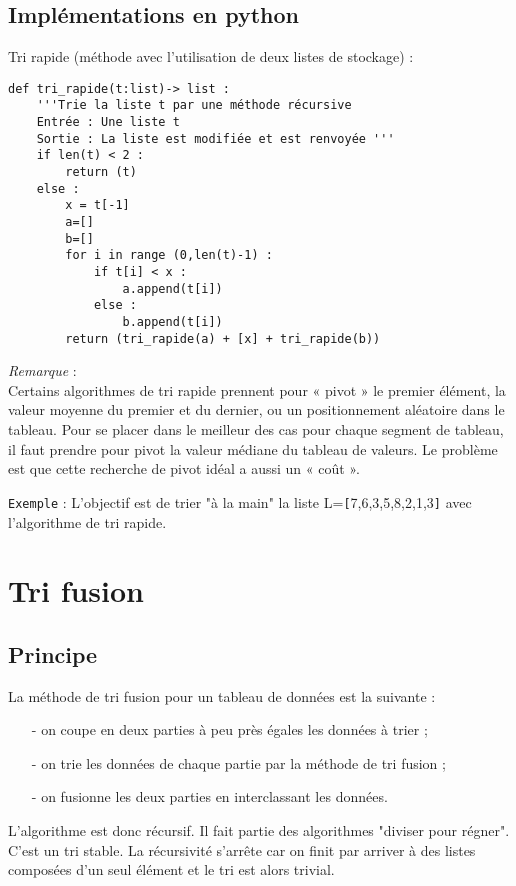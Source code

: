 \documentclass[t,11pt]{article}
\begin{document}
\newpage
\subsection{Implémentations en python}


Tri rapide (méthode avec l'utilisation de deux listes de stockage) :
\begin{lstlisting}
def tri_rapide(t:list)-> list :
	'''Trie la liste t par une méthode récursive
	Entrée : Une liste t
	Sortie : La liste est modifiée et est renvoyée '''
	if len(t) < 2 :
		return (t)
	else :
		x = t[-1]
		a=[]
		b=[]
		for i in range (0,len(t)-1) :
			if t[i] < x :
				a.append(t[i])
			else :
				b.append(t[i])
		return (tri_rapide(a) + [x] + tri_rapide(b))
\end{lstlisting}


\textit{Remarque} :\\
Certains algorithmes de tri rapide prennent pour « pivot » le premier élément, la valeur moyenne du premier et du dernier, ou un positionnement aléatoire dans le tableau. Pour se placer dans le meilleur des cas pour chaque segment de tableau, il faut prendre pour pivot la valeur médiane du tableau de valeurs. Le problème est que cette recherche de pivot idéal a aussi un « coût ».

\vspace*{0.5cm}
\texttt{Exemple} : L'objectif est de trier "à la main"  la liste L=\verb![!7,6,3,5,8,2,1,3\verb!]! avec l'algorithme de tri rapide.

\begin{python}
\vspace*{9cm}
\end{python}

\section{Tri fusion}
\subsection{Principe}
\noindent
La méthode de tri fusion pour un tableau de données est la suivante :
\begin{itemize}
\item[-] on coupe en deux parties à peu près égales les données à trier ;
\item[-] on trie les données de chaque partie par la méthode de tri fusion ;
\item[-] on fusionne les deux parties en interclassant les données.
\end{itemize}
\noindent
L'algorithme est donc récursif. Il fait partie des algorithmes "diviser pour régner". C'est un tri stable. La récursivité s'arrête car on finit par arriver à des listes composées d'un seul élément et le tri est alors trivial.
\end{document}
